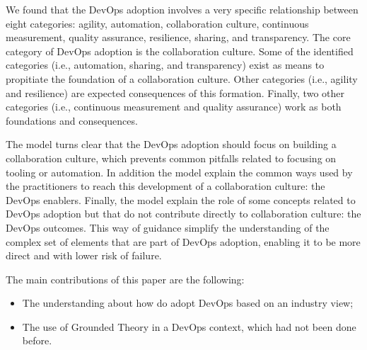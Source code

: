 
We found that the DevOps adoption involves a very specific relationship between
eight categories: agility, automation, collaboration culture, continuous
measurement, quality assurance, resilience, sharing, and transparency. The core
category of DevOps adoption is the collaboration culture. Some of the
identified categories (i.e., automation, sharing, and transparency) exist as
means to propitiate the foundation of a collaboration culture. Other categories
(i.e., agility and resilience) are expected consequences of this formation.
Finally, two other categories (i.e., continuous measurement and quality
assurance) work as both foundations and consequences.

The model turns clear that the DevOps adoption should focus on building a
collaboration culture, which prevents common pitfalls related to focusing on
tooling or automation. In addition the model explain the common ways used by
the practitioners to reach this development of a collaboration culture: the
DevOps enablers. Finally, the model explain the role of some concepts related to
DevOps adoption but that do not contribute directly to collaboration culture:
the DevOps outcomes. This way of guidance simplify the understanding of the
complex set of elements that are part of DevOps adoption, enabling it to be
more direct and with lower risk of failure.

%

The main contributions of this paper are the following:

\begin{itemize}
\item The understanding about how do adopt DevOps based on an industry view;
\item The use of Grounded Theory in a DevOps context, which had not been done before.
\end{itemize}



